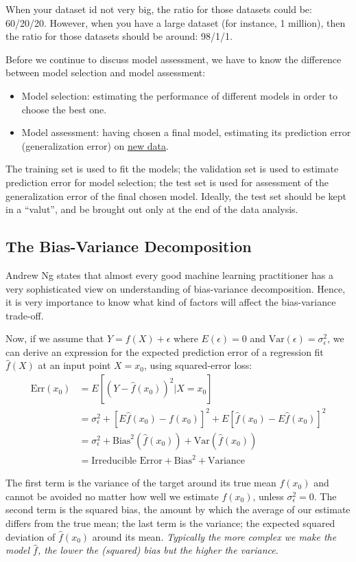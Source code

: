 \documentclass[12pt]{article}
\theoremstyle{definition}
\numberwithin{equation}{section}
\begin{document}
When your dataset id not very big, the ratio for those datasets could be: 60/20/20. However, when you have a large dataset (for instance, 1 million), then the ratio for those datasets should be around: 98/1/1. 

Before we continue to discuss model assessment, we have to know the difference between model selection and model assessment:
\begin{itemize}
	\item Model selection: estimating the performance of different models in order to choose the best one. 
	\item Model assessment: having chosen a final model, estimating its prediction error (generalization error) on \underline{new data}. 
\end{itemize}

The training set is used to fit the models; the validation set is used to estimate prediction error for model selection; the test set is used for assessment of the generalization error of the final chosen model. Ideally, the test set should be kept in a ``valut'', and be brought out only at the end of the data analysis. 

\subsection{The Bias-Variance Decomposition}

Andrew Ng states that almost every good machine learning practitioner has a very sophisticated view on understanding of bias-variance decomposition. Hence, it is very importance to know what kind of factors will affect the bias-variance trade-off. 


Now, if we assume that $Y = f(X) + \epsilon$ where $E(\epsilon) = 0$ and $\text{Var}(\epsilon) = \sigma_{\epsilon}^2$, we can derive an expression for the expected prediction error of a regression fit $\hat{f}(X)$ at an input point $X = x_0$, using squared-error loss: 
\begin{align*}
	\text{Err}(x_0) & = E[(Y - \hat{f}(x_0))^2 | X = x_0] \\
	& = \sigma_{\epsilon}^2 + [ E \hat{f}(x_0) - f(x_0)]^2 + E[\hat{f}(x_0) - E \hat{f}(x_0)]^2 \\
	& = \sigma_{\epsilon}^2 + \text{Bias}^2(\hat{f}(x_0)) + \text{Var}(\hat{f}(x_0)) \\
	& = \text{Irreducible Error} + \text{Bias}^2 + \text{Variance} 
\end{align*}

The first term is the variance of the target around its true mean $f(x_0)$ and cannot be avoided no matter how well we estimate $f(x_0)$, unless $\sigma_{\epsilon}^2 = 0$. The second term is the squared bias, the amount by which the average of our estimate differs from the true mean; the last term is the variance; the expected squared deviation of $\hat{f}(x_0)$ around its mean. \textit{Typically the more complex we make the model $\hat{f}$, the lower the (squared) bias but the higher the variance}. 
\end{document}
